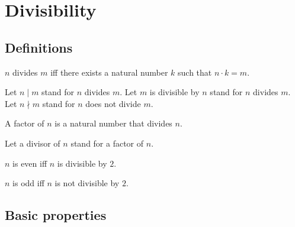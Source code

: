 \documentclass[../../natural-numbers.ftl.tex]{subfiles}
\begin{document}


  \section{Divisibility}

  \subsection{Definitions}

  \begin{forthel}
    \begin{definition}
      $n$ divides $m$ iff there exists a natural number $k$ such that $n \cdot k = m$.
    \end{definition}

    Let $n \mid m$ stand for $n$ divides $m$.
    Let $m$ is divisible by $n$ stand for $n$ divides $m$.
    Let $n \nmid m$ stand for $n$ does not divide $m$.

    \begin{definition}
      A factor of $n$ is a natural number that divides $n$.
    \end{definition}

    Let a divisor of $n$ stand for a factor of $n$.

    \begin{definition}
      $n$ is even iff $n$ is divisible by $2$.
    \end{definition}

    \begin{definition}
      $n$ is odd iff $n$ is not divisible by $2$.
    \end{definition}
  \end{forthel}


  \subsection{Basic properties}
\end{document}

